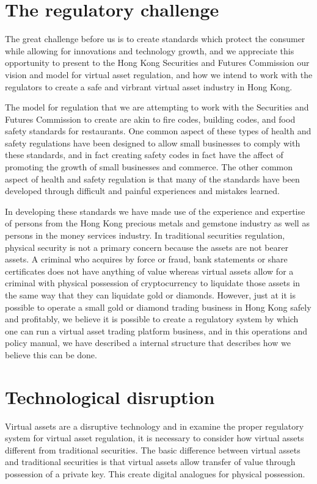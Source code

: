 \section{The regulatory challenge}
The great challenge before us is to create standards which protect the
consumer while allowing for innovations and technology growth, and we
appreciate this opportunity to present to the Hong Kong Securities and
Futures Commission our vision and model for virtual asset regulation,
and how we intend to work with the regulators to create a safe and
virbrant virtual asset industry in Hong Kong.

The model for regulation that we are attempting to work with the
Securities and Futures Commission to create are akin to fire codes,
building codes, and food safety standards for restaurants.  One common
aspect of these types of health and safety regulations have been
designed to allow small businesses to comply with these standards, and
in fact creating safety codes in fact have the affect of promoting the
growth of small businesses and commerce.  The other common aspect of
health and safety regulation is that many of the standards have been
developed through difficult and painful experiences and mistakes
learned.

In developing these standards we have made use of the experience and
expertise of persons from the Hong Kong precious metals and gemstone
industry as well as persons in the money services industry.  In
traditional securities regulation, physical security is not a primary
concern because the assets are not bearer assets.  A criminal who
acquires by force or fraud, bank statements or share certificates does
not have anything of value whereas virtual assets allow for a criminal
with physical possession of cryptocurrency to liquidate those assets
in the same way that they can liquidate gold or diamonds.  However,
just at it is possible to operate a small gold or diamond trading
business in Hong Kong safely and profitably, we believe it is possible
to create a regulatory system by which one can run a virtual asset
trading platform business, and in this operations and policy manual,
we have described a internal structure that describes how we believe
this can be done.

\section{Technological disruption}
Virtual assets are a disruptive technology and in examine the proper
regulatory system for virtual asset regulation, it is necessary to
consider how virtual assets different from traditional securities.
The basic difference between virtual assets and traditional securities
is that virtual assets allow transfer of value through possession of a
private key.  This create digital analogues for physical possession.

